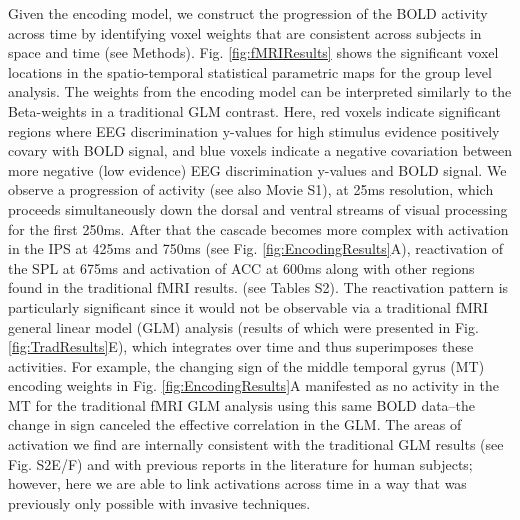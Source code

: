 Given the encoding model, we construct the progression of the BOLD activity across time by identifying voxel weights that are consistent across subjects in space and time (see Methods). Fig. \ref{fig:fMRIResults} shows the significant voxel locations in the spatio-temporal statistical parametric maps for the group level analysis. The weights from the encoding model can be interpreted similarly to the Beta-weights in a traditional GLM contrast. Here, red voxels indicate significant regions where EEG discrimination y-values for high stimulus evidence positively covary with BOLD signal, and blue voxels indicate a negative covariation between more negative (low evidence) EEG discrimination y-values and BOLD signal. We observe a progression of activity (see also Movie S1), at 25ms resolution, which proceeds simultaneously down the dorsal and ventral streams of visual processing for the first 250ms. After that the cascade becomes more complex with activation in the IPS at 425ms and 750ms (see Fig. \ref{fig:EncodingResults}A), reactivation of the SPL at 675ms and activation of ACC at 600ms along with other regions found in the traditional fMRI results. (see Tables S2). The reactivation pattern is particularly significant since it would not be observable via a traditional fMRI general linear model (GLM) analysis (results of which were presented in Fig. \ref{fig:TradResults}E), which integrates over time and thus superimposes these activities. For example, the changing sign of the middle temporal gyrus (MT) encoding weights in Fig. \ref{fig:EncodingResults}A manifested as no activity in the MT for the traditional fMRI GLM analysis using this same BOLD data--the change in sign canceled the effective correlation in the GLM. The areas of activation we find are internally consistent with the traditional GLM results (see Fig. S2E/F) and with previous reports in the literature for human subjects\cite{Heekeren2004,Philiastides2007}; however, here we are able to link activations across time in a way that was previously only possible with invasive techniques. 

